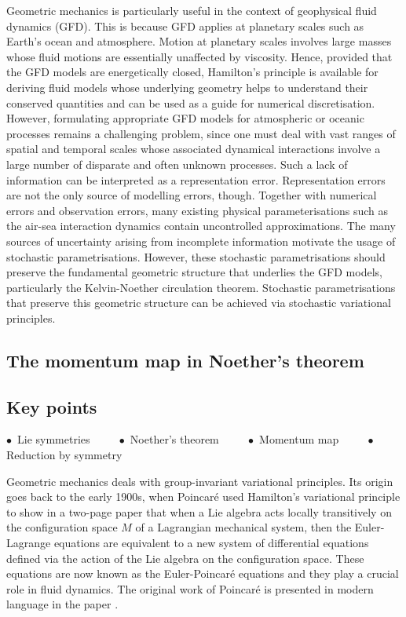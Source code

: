 \documentclass[11pt, oneside]{article}   	%
\numberwithin{equation}{section}
\theoremstyle{plain}
\theoremstyle{definition}
\theoremstyle{remark}
\newcommand{\<}{\langle}
\renewcommand{\>}{\rangle}
\begin{document}
Geometric mechanics is particularly useful in the context of geophysical fluid dynamics (GFD). This is because GFD applies at planetary scales such as Earth's ocean and atmosphere. Motion at planetary scales involves large masses whose fluid motions are essentially unaffected by viscosity. Hence, provided that the GFD models are energetically closed, Hamilton's principle is available for deriving fluid models whose underlying geometry helps to understand their conserved quantities and can be used as a guide for numerical discretisation. However, formulating appropriate GFD models for atmospheric or oceanic processes remains a challenging problem, since one must deal with vast ranges of spatial and temporal scales whose associated dynamical interactions involve a large number of disparate and often unknown processes. Such a lack of information can be interpreted as a representation error. Representation errors are not the only source of modelling errors, though. Together with numerical errors and observation errors, many  existing physical parameterisations such as the air-sea interaction dynamics contain uncontrolled approximations. The many sources of uncertainty arising from incomplete information 
motivate the usage of stochastic parametrisations. However, these stochastic parametrisations should preserve the fundamental geometric structure that underlies the GFD models, particularly the Kelvin-Noether circulation theorem. Stochastic parametrisations that preserve this geometric structure can be achieved via stochastic variational principles.


\subsection{The momentum map in Noether's theorem} 
\subsection*{Key points}
\begin{center}
    $\bullet\,$ Lie symmetries $\qquad$ 
    $\bullet\,$ Noether's theorem $\qquad$
    $\bullet\,$ Momentum map $\qquad$
    $\bullet\,$ Reduction by symmetry  
\end{center}
Geometric mechanics deals with group-invariant variational principles. Its origin goes back to the early 1900s, when Poincar\'e used Hamilton's variational principle to show in a two-page paper \cite{poincare1901forme} that when a Lie algebra acts locally transitively on the configuration space $M$ of a Lagrangian mechanical system, then the Euler-Lagrange equations are equivalent to a new system of differential equations defined via the action of the Lie algebra on the configuration space. These equations are now known as the Euler-Poincar\'e equations and they play a crucial role in fluid dynamics. The original work of Poincar\'e is presented in modern language in the paper \cite{marle2013henri}. 
\end{document}

